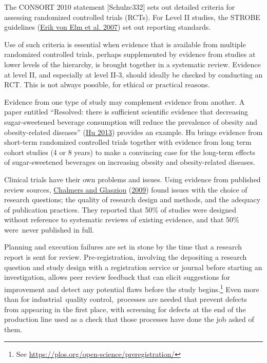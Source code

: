 \documentclass[
  10pt,
  b5paper]{book}
\begin{document}
The CONSORT 2010 statement {[}Schulzc332{]} sets out detailed criteria
for assessing randomized controlled trials (RCTs). For Level II
studies, the STROBE guidelines (\protect\hyperlink{ref-erik2007strengthening}{Erik von Elm et al. 2007}) set out
reporting standards.

Use of such criteria is essential when evidence that is available
from multiple randomized controlled trials, perhaps supplemented
by evidence from studies at lower levels of the hierarchy, is
brought together in a systematic review. Evidence at level II,
and especially at level II-3, should ideally be checked by
conducting an RCT. This is not always possible, for ethical or
practical reasons.

Evidence from one type of study may complement evidence from
another. A paper entitled ``Resolved: there is sufficient
scientific evidence that decreasing sugar-sweetened beverage
consumption will reduce the prevalence of obesity and
obesity-related diseases'' (\protect\hyperlink{ref-hu2013resolved}{Hu 2013}) provides an
example. Hu brings evidence from short-term randomized
controlled trials together with evidence from long term
cohort studies (4 or 8 years) to make a convincing case
for the long-term effects of sugar-sweetened beverages on
increasing obesity and obesity-related diseases.

Clinical trials have their own problems and issues. Using
evidence from published review sources, \protect\hyperlink{ref-chalmers2009avoidable}{Chalmers and Glasziou} (\protect\hyperlink{ref-chalmers2009avoidable}{2009})
found issues with the choice of research questions; the quality
of research design and methods, and the adequacy of
publication practices. They reported that 50\% of studies were
designed without reference to systematic reviews of existing
evidence, and that 50\% were~never published in full.

Planning and execution failures are set in stone by the time
that a research report is sent for review. Pre-registration,
involving the depositing a research question and study design
with a registration service or journal before starting an
investigation, allows peer review feedback that can elicit
suggestions for improvement and detect any potential flaws
before the study
begins.\footnote{See \url{https://plos.org/open-science/preregistration/}}
Even more than for industrial~quality control,~processes
are needed that prevent defects from appearing in the first
place, with screening for defects at the end of the production
line used as a check that those processes have done the job
asked of them.
\end{document}
